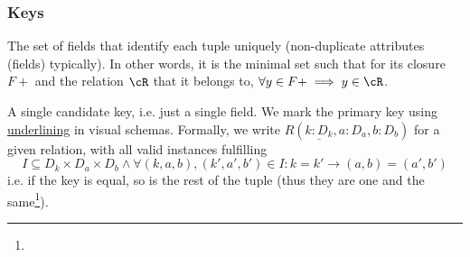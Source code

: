 \subsubsection{Keys}
\label{sec:relations-keys}
 The  set of fields that identify each tuple uniquely (non-duplicate attributes (fields) typically).
In other words, it is the minimal set such that for its closure $F+$ and the relation $\cR$ that it belongs to, $\forall y \in F+ \implies y \in \cR$.

 A single candidate key, i.e. just a single field.
We mark the primary key using \underline{underlining} in visual \glspl{schema}.
Formally, we write $R(\underline{k : D_k}, a:D_a, b:D_b)$ for a given relation, with all valid instances fulfilling
\[
    I \subseteq D_k \times D_a \times D_b \land \forall (k, a, b), (k', a', b') \in I : k = k' \rightarrow (a, b) = (a', b')
\]
i.e. if the key is equal, so is the rest of the tuple (thus they are one and the same\footnote{}).

